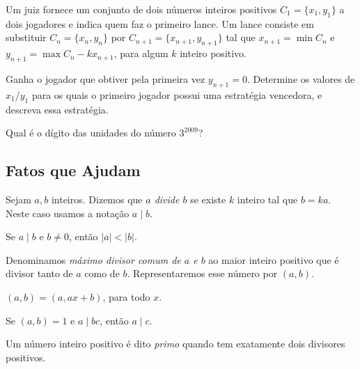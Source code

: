 \documentclass[10pt,a4paper]{article}
\begin{document}
	\begin{prob}
		Um juiz fornece um conjunto de dois números inteiros positivos $C_1=\{x_1,y_1\}$ a dois jogadores e indica quem faz o primeiro lance. Um lance consiste em substituir $C_n=\{x_n,y_n\}$ por $C_{n+1}=\{x_{n+1},y_{n+1}\}$ tal que $x_{n+1}=\min C_n$ e $y_{n+1}= \max C_n -kx_{n+1}$, para algum $k$ inteiro positivo. 

	Ganha o jogador que obtiver pela primeira vez $y_{n+1}=0$. Determine os valores de $x_1/y_1$ para os quais o primeiro jogador possui uma estratégia vencedora, e descreva essa estratégia.
	\end{prob}
	
	\begin{prob}
		Qual é o dígito das unidades do número $3^{2009}$?
	\end{prob}
	

	\subsection*{Fatos que Ajudam}

	\begin{defn}[Divisibilidade]
		Sejam $a, b$ inteiros. Dizemos que \emph{$a$ divide $b$} se existe $k$ inteiro tal que $b=ka$. Neste caso usamos a notação $a  \mid  b$.
	\end{defn}

	\begin{prop}[Desigualdade]
		Se $a \mid b$ e $b \neq 0$, então $ |a| < |b| $.
	\end{prop}

	\begin{defn}
		Denominamos \emph{máximo divisor comum de $a$ e $b$} ao maior inteiro positivo que é divisor tanto de $a$ como de $b$. Representaremos esse número por $(a,b)$.
	\end{defn}

	\begin{prop}
		$(a,b)=(a, ax+b)$, para todo $x$.
	\end{prop}

	\begin{thm}
		Se $(a,b)=1$ e $a  \mid  bc$, então $a  \mid  c$.
	\end{thm}

	\begin{defn}[Primos]
		Um número inteiro positivo é dito \emph{primo} quando tem exatamente dois divisores positivos.
	\end{defn}
\end{document}
